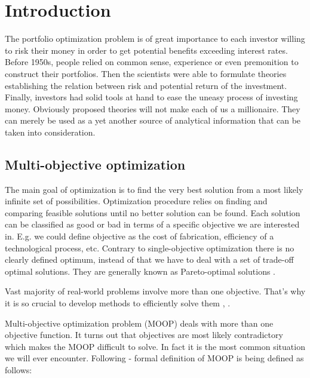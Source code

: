 
\section{Introduction}
\label{sec:introduction}

    The portfolio optimization problem is of great importance to each investor willing to risk
their money in order to get potential benefits exceeding interest rates.
Before 1950s, people relied on common sense, experience or even premonition to construct their portfolios.
Then the scientists \cite{MPT} were able to formulate theories establishing the relation between risk and potential
return of the investment.
Finally, investors had solid tools at hand to ease the uneasy process of investing money.
Obviously proposed theories will not make each of us a millionaire.
They can merely be used as a yet another source of analytical information that can be taken into consideration.

\subsection{Multi-objective optimization}

\label{sec:multi}

The main goal of optimization is to find the very best solution from a most likely infinite set of possibilities.
Optimization procedure relies on finding and comparing feasible solutions until no better solution can be found.
Each solution can be classified as good or bad in terms of a specific objective we are interested in.
E.g. we could define objective as the cost of fabrication, efficiency of a technological process, etc.
Contrary to single-objective optimization there is no clearly defined optimum, instead of that we have to deal with a set of trade-off optimal solutions.
They are generally known as Pareto-optimal solutions \cite{zitz1999a}.

Vast majority of real-world problems involve more than one objective.
That's why it is so crucial to develop methods to efficiently solve them 
\cite{zitz1999a}, \cite{Deb:2001:MOU:559152}.

Multi-objective optimization problem (MOOP) deals with more than one objective function.
It turns out that objectives are most likely contradictory which makes the MOOP difficult to solve.
In fact it is the most common situation we will ever encounter. 
Following \cite{Deb:2001:MOU:559152} - formal definition of MOOP is being defined as follows:


